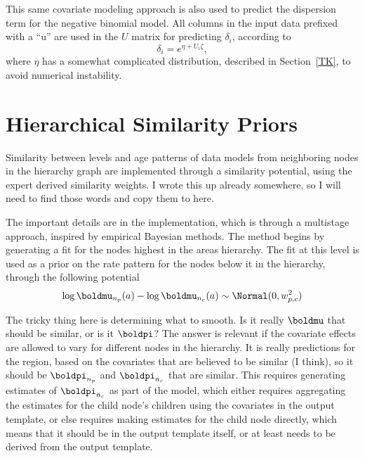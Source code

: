 This same covariate modeling approach is also used to predict the
dispersion term for the negative binomial model.  All columns in the
input data prefixed with a ``u'' are used in the $U$ matrix for
predicting $\delta_i$, according to
\[
\delta_i = e^{\eta + U_i\zeta},
\]
where $\eta$ has a somewhat complicated distribution, described in
Section~\ref{TK}, to avoid numerical instability.


\section{Hierarchical Similarity Priors}
Similarity between levels and age patterns of data models from
neighboring nodes in the hierarchy graph are implemented through a
similarity potential, using the expert derived similarity weights.  I
wrote this up already somewhere, so I will need to find those words
and copy them to here.

The important details are in the implementation, which is through a
multistage approach, inspired by empirical Bayesian methods.  The
method begins by generating a fit for the nodes highest in the areas
hierarchy.  The fit at this level is used as a prior on the rate
pattern for the nodes below it in the hierarchy, through the following
potential
\[
\log \boldmu_{n_p}(a) - \log \boldmu_{n_c}(a) \sim \Normal(0,
w_{p,c}^2)
\]

The tricky thing here is determining what to smooth.  Is it really
$\boldmu$ that should be similar, or is it $\boldpi$?  The answer is
relevant if the covariate effects are allowed to vary for different
nodes in the hierarchy.  It is really predictions for the region,
based on the covariates that are believed to be similar (I think), so
it should be $\boldpi_{n_p}$ and $\boldpi_{n_c}$ that are similar.
This requires generating estimates of $\boldpi_{n_c}$ as part of the
model, which either requires aggregating the estimates for the child
node's children using the covariates in the output template, or else
requires making estimates for the child node directly, which means
that it should be in the output template itself, or at least needs to
be derived from the output template.
